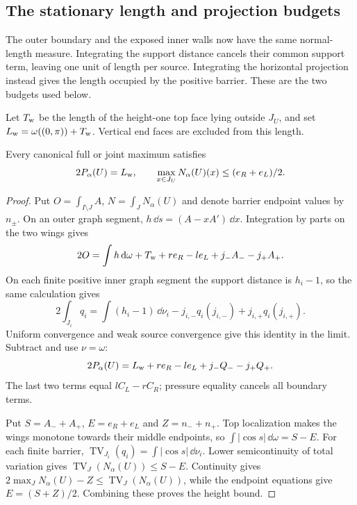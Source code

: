 \subsection{The stationary length and projection budgets}

The outer boundary and the exposed inner walls now have the same
normal-length measure. Integrating the support distance cancels their
common support term, leaving one unit of length per source. Integrating
the horizontal projection instead gives the length occupied by the
positive barrier. These are the two budgets used below.

Let $T_{\rm w}$ be the length of the height-one top face lying
outside $J_U$, and set $L_{\rm w}=\omega((0,\pi))+T_{\rm w}$.
Vertical end faces are excluded from this length.

\begin{corollary}\label{cor:variation-green}
Every canonical full or joint maximum satisfies
\begin{equation}\label{eq:variation-green}
 2P_\alpha(U)=L_{\rm w},\qquad
 \max_{x\in J_U}N_\alpha(U)(x)\le(e_R+e_L)/2.
\end{equation}
\end{corollary}

\begin{proof}
Put $O=\int_{I\setminus J}A$, $N=\int_JN_\alpha(U)$ and denote
barrier endpoint values by $n_\pm$. On an outer graph segment,
$h\,\dd s=(A-xA')\,\dd x$. Integration by parts on the two wings gives
\[
 2O=\int h\,\mathrm{d}\omega+T_{\rm w}+re_R-le_L+j_-A_- -j_+A_+.
\]
On each finite positive inner graph segment the support distance is
$h_i-1$, so the same calculation gives
\[
 2\int_{J_i}q_i=\int(h_i-1)\,\dd\nu_i
                    -j_{i,-}q_i(j_{i,-})+j_{i,+}q_i(j_{i,+}).
\]
Uniform convergence and weak source convergence give this identity
in the limit. Subtract and use $\nu=\omega$:
\[
 2P_\alpha(U)=L_{\rm w}+re_R-le_L+j_-Q_- -j_+Q_+.
\]
The last two terms equal $lC_L-rC_R$; pressure equality cancels
all boundary terms.

Put $S=A_-+A_+$, $E=e_R+e_L$ and $Z=n_-+n_+$.
Top localization makes the wings monotone towards their middle
endpoints, so $\int|\cos s|\,\dd\omega=S-E$.
For each finite barrier,
$\operatorname{TV}_{J_i}(q_i)=\int|\cos s|\,\dd\nu_i$.
Lower semicontinuity of total variation gives
$\operatorname{TV}_{J}(N_\alpha(U))\le S-E$.
Continuity gives $2\max_JN_\alpha(U)-Z\le\operatorname{TV}_{J}(N_\alpha(U))$,
while the endpoint equations give $E=(S+Z)/2$.
Combining these proves the height bound.
\end{proof}

